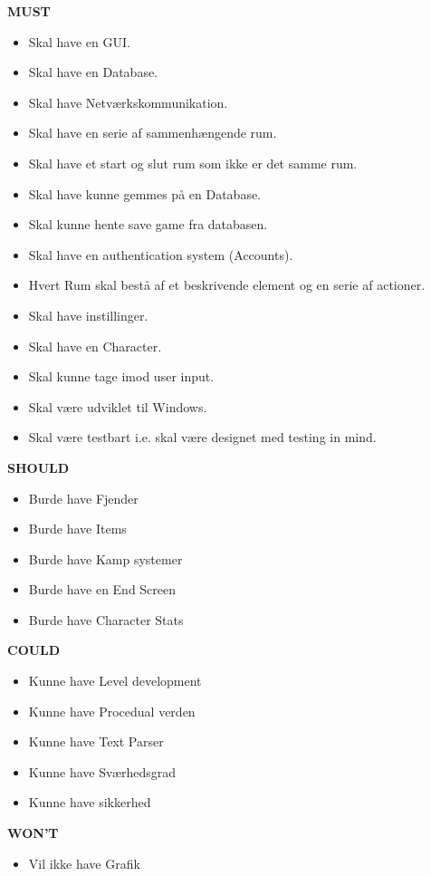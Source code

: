 \textbf{MUST}
\begin{itemize}
  \item Skal have en GUI.
  \item Skal have en Database.
  \item Skal have Netværkskommunikation.
  \item Skal have en serie af sammenhængende rum.
  \item Skal have et start og slut rum som ikke er det samme rum.
  \item Skal have kunne gemmes på en Database.
  \item Skal kunne hente save game fra databasen.
  \item Skal have en authentication system (Accounts).
  \item Hvert Rum skal bestå af et beskrivende element og en serie af actioner.
  \item Skal have instillinger.
  \item Skal have en Character.
  \item Skal kunne tage imod user input.
  \item Skal være udviklet til Windows.
  \item Skal være testbart i.e. skal være designet med testing in mind.
\end{itemize}


\textbf{SHOULD}
\begin{itemize}
  \item Burde have Fjender
  \item Burde have Items
  \item Burde have Kamp systemer
  \item Burde have en End Screen
  \item Burde have Character Stats
\end{itemize}

\textbf{COULD}

\begin{itemize}
  \item Kunne have Level development
  \item Kunne have Procedual verden
  \item Kunne have Text Parser
  \item Kunne have Sværhedsgrad
  \item Kunne have sikkerhed
\end{itemize}

\textbf{WON'T}
\begin{itemize}
  \item Vil ikke have Grafik
\end{itemize}

 
